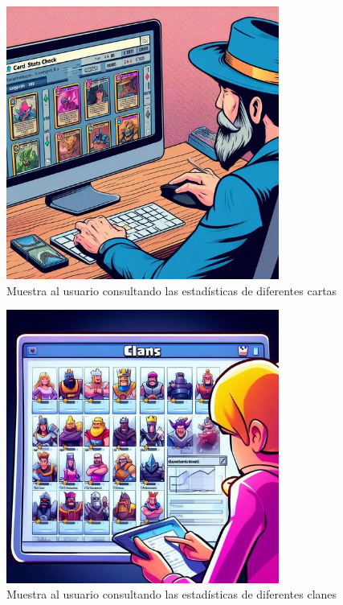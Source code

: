 \begin{figure}[H]
  \centering
  \includegraphics[width=0.8\textwidth]{../images/comic_query_card_stats.jpeg}
  \caption{Muestra al usuario consultando las estadísticas de diferentes cartas}
\end{figure}

\begin{figure}[H]
  \centering
  \includegraphics[width=0.8\textwidth]{../images/comic_query_clan_stats.jpeg}
  \caption{Muestra al usuario consultando las estadísticas de diferentes clanes}
\end{figure}


